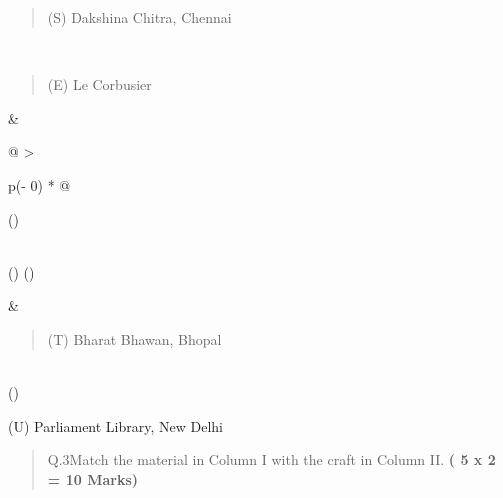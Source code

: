 \documentclass[
]{article}
\begin{document}
\begin{longtable}[]
\begin{minipage}[t]{\linewidth}
\begin{quote}
(S) Dakshina Chitra, Chennai
\end{quote}
\end{minipage} \\
\begin{minipage}[t]{\linewidth}\raggedright
\begin{quote}
(E) Le Corbusier
\end{quote}
\end{minipage} & \begin{minipage}[t]{\linewidth}\raggedright
\begin{longtable}[]{@{}
  >{\raggedright\arraybackslash}p{(\columnwidth - 0\tabcolsep) * }@{}}
\toprule()
\begin{minipage}[b]{\linewidth}\raggedright
\end{minipage} \\
\midrule()
\endhead
\bottomrule()
\end{longtable}
\end{minipage} & \begin{minipage}[t]{\linewidth}\raggedright
\begin{quote}
(T) Bharat Bhawan, Bhopal
\end{quote}
\end{minipage} \\
\bottomrule()
\end{longtable}

(U) Parliament Library, New Delhi

\begin{quote}
Q.3Match the material in Column I with the craft in Column II. \textbf{(
5 x 2 = 10 Marks)}
\end{quote}
\end{document}
